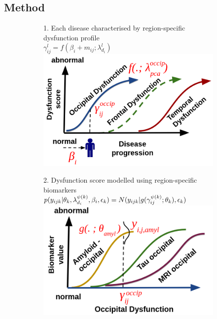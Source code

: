 \documentclass[portrait,a0,final,20pt]{a0poster}
\newcommand{\fnt}[1]{\LARGE{#1}}
\begin{document}
{\begin{multicols}{2}
\section*{Method}



 \vspace{1em}
 \begin{figure}[H]
 \centering
  \begin{subfigure}{0.49\columnwidth}
   \centering
   \fnt{1. Each disease characterised by region-specific dysfunction profile}\\
   $ \gamma_{ij}^l = f(\beta_{i} + m_{ij}; \lambda_{d_i}^l) $\\
   \includegraphics[width=\textwidth]{diseaseEvol}
   
  \end{subfigure}
  \begin{subfigure}{0.49\columnwidth}
   \centering
   \fnt{2. Dysfunction score modelled using region-specific biomarkers}\\
   $ p(y_{ijk}|\theta_k, \lambda_{d_i}^{\psi(k)}, \beta_{i}, \epsilon_k) = N(y_{ijk}| g( \gamma_{ij}^{\psi(k)} ; \theta_k), \epsilon_k) $
   \includegraphics[width=\textwidth]{dysfuncEvol}
  \end{subfigure}


\end{figure}
\end{multicols}}
\end{document}
